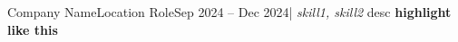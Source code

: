 \resumeSubheading
{Company Name}{Location}
{Role}{Sep 2024 -- Dec 2024}{| \textit{skill1, skill2}}
\resumeItemListStart
{}
{desc \textbf{highlight like this}}
\resumeItemListEnd
